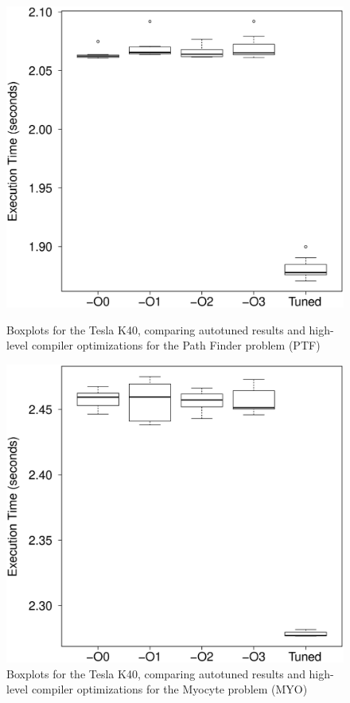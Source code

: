\begin{figure}[htpb]
    \begin{minipage}{.48\textwidth}
        \centering
        \includegraphics[scale=.22]{./images/Pathfinder-0-Tesla-K40-Box.eps}
        \caption{Boxplots for the Tesla K40, comparing autotuned results and high-level compiler optimizations for the Path Finder problem (PTF)}
        \label{fig:K40ptf}
    \end{minipage}%
    \hfill
    \begin{minipage}{.48\textwidth}
        \centering
        \includegraphics[scale=.22]{./images/myocyte-0-Tesla-K40-Box.eps}
        \caption{Boxplots for the Tesla K40, comparing autotuned results and high-level compiler optimizations for the Myocyte problem (MYO)}
        \label{fig:K40myo}
    \end{minipage}%
\end{figure}

